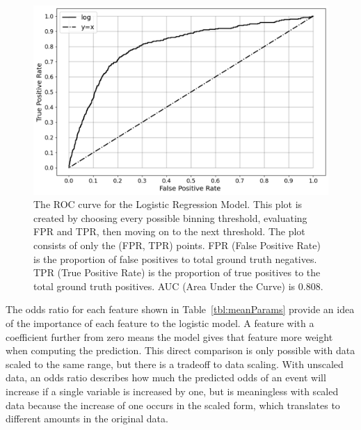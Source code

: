 \documentclass[10pt,letterpaper]{article}
\newcommand{\red}[1]{{\color{red}{#1}}}
\begin{document}
\begin{figure}[htb]
    \centering
    \includegraphics[width=\textwidth]{../img/ROC.png}
    \caption[ROC curve]{The ROC curve for the Logistic Regression Model. This plot is created by choosing every possible binning threshold, evaluating FPR and TPR, then moving on to the next threshold. The plot consists of only the (FPR, TPR) points. FPR (False Positive Rate) is the proportion of false positives to total ground truth negatives. TPR (True Positive Rate) is the proportion of true positives to the total ground truth positives. AUC (Area Under the Curve) is 0.808. \red{REMOVE GRAPHICS BEFORE SUBMISSION}}
    \label{fig:ROC}
\end{figure}

The odds ratio for each feature shown in Table~\ref{tbl:meanParams} provide an idea of the importance of each feature to the logistic model. A feature with a coefficient further from zero means the model gives that feature more weight when computing the prediction. This direct comparison is only possible with data scaled to the same range, but there is a tradeoff to data scaling. With unscaled data, an odds ratio describes how much the predicted odds of an event will increase if a single variable is increased by one, but is meaningless with scaled data because the increase of one occurs in the scaled form, which translates to different amounts in the original data. \red{update wording}
\end{document}

